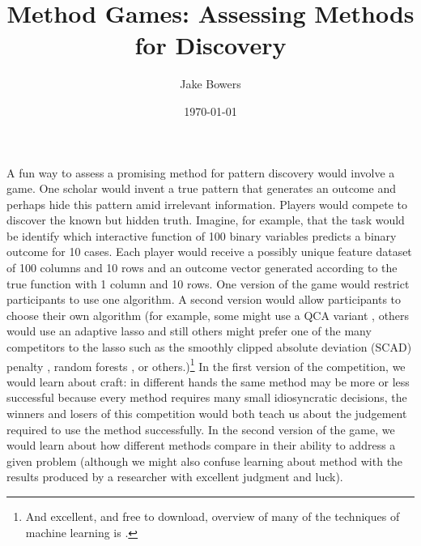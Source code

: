 \documentclass[12pt]{article}
\title{Method Games: Assessing Methods for Discovery}
\author{Jake Bowers}
\date{\today}
\begin{document}
\maketitle

A fun way to assess a promising method for pattern discovery would involve a
game.  One scholar would invent a true pattern that generates an outcome and
perhaps hide this pattern amid irrelevant information.  Players would compete
to discover the known but hidden truth.  Imagine, for example, that the task
would be identify which interactive function of 100 binary variables predicts
a binary outcome for 10 cases. Each player would receive a possibly unique
feature dataset of 100 columns and 10 rows and an outcome vector generated
according to the true function with 1 column and 10 rows. One version of the
game would restrict participants to use one algorithm. A second version would
allow participants to choose their own algorithm (for example, some might use
a QCA variant \cite{rihoux2008configurational}, others would use an adaptive
lasso \citet{zou2006adaptive} and still others might prefer one of the many
competitors to the lasso such as the smoothly clipped absolute deviation
(SCAD) penalty \cite{fan2001variable}, random forests
\cite{breiman2001random}, or others.)\footnote{And excellent, and free to
	download, overview of many of the techniques of machine learning is
	\citet{hastie2005elements}.} In the first version of the competition, we
would learn about craft: in different hands the same method may be more or
less successful because every method requires many small idiosyncratic
decisions, the winners and losers of this competition would both teach us
about the judgement required to use the method successfully.  In the second
version of the game, we would learn about how different methods compare in
their ability to address a given problem (although we might also confuse
learning about method with the results produced by a researcher with excellent
judgment and luck).
\end{document}
